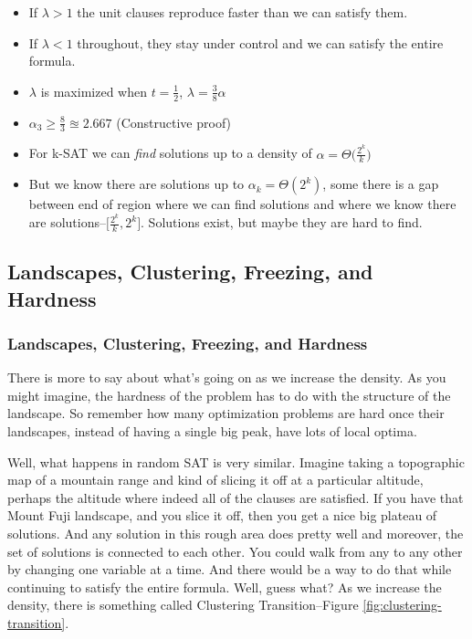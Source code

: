\documentclass[]{article}
\begin{document}
\begin{itemize}
	\item If $\lambda>1$ the unit clauses reproduce faster than we can satisfy them.
	\item If $\lambda<1$ throughout, they stay under control and we can satisfy the entire formula. 
	\item $\lambda$ is maximized when $t=\frac{1}{2}$, $\lambda = \frac{3}{8} \alpha$
	\item $\alpha_3\ge\frac{8}{3}\approxeq2.667$ (Constructive proof)
	\item For k-SAT we can \emph{find} solutions up to a density of $\alpha = \Theta\big(\frac{2^k}{k}\big)$
	\item But we know there are solutions up to $\alpha_k=\Theta(2^k)$, some there is a gap between end of region where we can find solutions and where we know there are solutions--$\big[\frac{2^k}{k},2^k\big]$. Solutions exist, but maybe they are hard to find.
\end{itemize}

\subsection{Landscapes, Clustering, Freezing, and Hardness }

\subsubsection{Landscapes, Clustering, Freezing, and Hardness }

There is more to say about what's going on as we increase the density.
As you might imagine, the hardness of the problem has to do with the structure of the landscape. 
So remember how many optimization problems are hard once their landscapes, instead of having a single big peak, have lots of local optima.

Well, what happens in random SAT is very similar.
Imagine taking a topographic map of a mountain range and kind of slicing it off at a particular altitude, perhaps the altitude where indeed all of the clauses are satisfied.
If you have that Mount Fuji landscape, and you slice it off, then you get a nice big plateau of solutions.
And any solution in this rough area does pretty well and moreover, the set of solutions is connected to each other.
You could walk from any to any other by changing one variable at a time.
And there would be a way to do that while continuing to satisfy the entire formula.
Well, guess what?
As we increase the density, there is something called Clustering Transition--Figure \ref{fig:clustering-transition}. 
\end{document}
